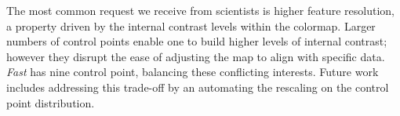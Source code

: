 \documentclass{IEEEcsmag}
\newcommand*{\colormap}[1]{\textsl{#1}\xspace}
\newcommand*{\huewheel}{\colormap{Hue Wheel}}
\newcommand*{\fast}{\colormap{Fast}}
\begin{document}


The most common request we receive from scientists is higher feature resolution, a property driven by the internal contrast levels within the colormap.
Larger numbers of control points enable one to build higher levels of internal contrast; however they disrupt the ease of adjusting the map to align with specific data.
\fast has nine control point, balancing these conflicting interests.
Future work includes addressing this trade-off by an automating the rescaling on the control point distribution.

\end{document}
